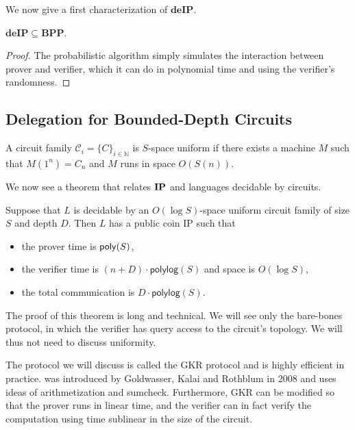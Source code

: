 We now give a first characterization of $\mathbf{deIP}$.

\begin{theorem}
	$\mathbf{deIP}\subseteq\mathbf{BPP}$.
	\label{thm:deip}
\end{theorem}
\begin{proof}
	The probabilistic algorithm simply simulates the interaction between prover and verifier, which it can do in polynomial time and using the verifier's randomness.
\end{proof}

\subsection{Delegation for Bounded-Depth Circuits}

\begin{definition}
	A circuit family $\mathcal{C}_i=\{C\}_{i\in\mathbb{N}}$ is $S$-space uniform if there exists a machine $M$ such that $M(1^n)=C_n$ and $M$ runs in space $O(S(n))$.
\end{definition}

We now see a theorem that relates $\mathbf{IP}$ and languages decidable by circuits.

\begin{theorem}
	Suppose that $L$ is decidable by an $O(\log S)$-space uniform circuit family of size $S$ and depth $D$. Then $L$ has a public coin IP such that
	\begin{itemize}
		\item the prover time is $\mathsf{poly}(S)$,
		\item the verifier time is $(n+D)\cdot\mathsf{polylog}(S)$ and space is $O(\log S)$,
		\item the total communication is $D\cdot\mathsf{polylog}(S)$.
	\end{itemize}
\end{theorem}

The proof of this theorem is long and technical. We will see only the bare-bones protocol, in which the verifier has query access to the circuit's topology. We will thus not need to discuss uniformity.

The protocol we will discuss is called the GKR protocol and is highly efficient in practice. \cite{10.1145/2699436} was introduced by Goldwasser, Kalai and Rothblum in 2008 and uses ideas of arithmetization and sumcheck. Furthermore, GKR can be modified so that the prover runs in linear time, and the verifier can in fact verify the computation using time sublinear in the size of the circuit.

